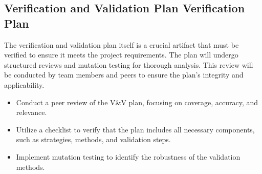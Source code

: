 \documentclass[12pt, titlepage]{article}
\begin{document}
\subsection{Verification and Validation Plan Verification Plan}
The verification and validation plan itself is a crucial artifact that must be verified to ensure it meets the project requirements. The plan will undergo structured reviews and mutation testing for thorough analysis. This review will be conducted by team members and peers to ensure the plan's integrity and applicability.

\begin{itemize}
    \item Conduct a peer review of the V\&V plan, focusing on coverage, accuracy, and relevance.
    \item Utilize a checklist to verify that the plan includes all necessary components, such as strategies, methods, and validation steps.
    \item Implement mutation testing to identify the robustness of the validation methods.
\end{itemize}
\end{document}
